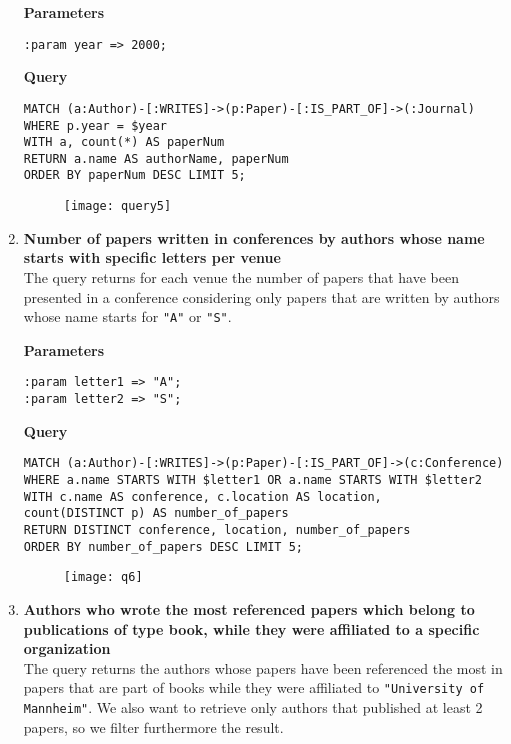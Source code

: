 \begin{enumerate}
    \textbf{Parameters}
    \begin{lstlisting}[label={lst:lstlisting28}]
:param year => 2000;
    \end{lstlisting}
    \textbf{Query}
    \begin{lstlisting}[label={lst:lstlisting29}]
MATCH (a:Author)-[:WRITES]->(p:Paper)-[:IS_PART_OF]->(:Journal)
WHERE p.year = $year
WITH a, count(*) AS paperNum
RETURN a.name AS authorName, paperNum
ORDER BY paperNum DESC LIMIT 5;
    \end{lstlisting}
    \begin{figure}[H]
        \begin{center}
            \texttt{[image: query5]}
            \label{fig:query5}%
        \end{center}
    \end{figure}
    \item \textbf{Number of papers written in conferences by authors whose name starts with specific letters per venue}\\
    The query returns for each venue the number of papers that have been presented in a conference considering only papers that are written by authors whose name starts for \verb|"A"| or \verb|"S"|.

    \textbf{Parameters}
    \begin{lstlisting}[label={lst:lstlisting30}]
:param letter1 => "A";
:param letter2 => "S";
    \end{lstlisting}
    \textbf{Query}
    \begin{lstlisting}[label={lst:lstlisting31}]
MATCH (a:Author)-[:WRITES]->(p:Paper)-[:IS_PART_OF]->(c:Conference)
WHERE a.name STARTS WITH $letter1 OR a.name STARTS WITH $letter2
WITH c.name AS conference, c.location AS location,
count(DISTINCT p) AS number_of_papers
RETURN DISTINCT conference, location, number_of_papers
ORDER BY number_of_papers DESC LIMIT 5;
    \end{lstlisting}
    \begin{figure}[H]
        \begin{center}
            \texttt{[image: q6]}
            \label{fig:q6}%
        \end{center}
    \end{figure}
    \item \textbf{Authors who wrote the most referenced papers which belong to publications of type book, while they were affiliated to a specific organization}\\
    The query returns the authors whose papers have been referenced the most in papers that are part of books while they were affiliated to \verb|"University of Mannheim"|.
    We also want to retrieve only authors that published at least 2 papers, so we filter furthermore the result.


\end{enumerate}
